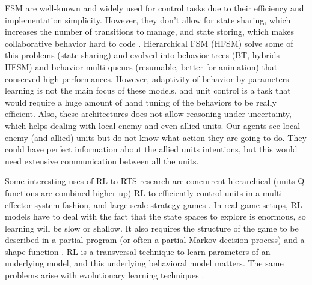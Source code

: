 FSM are well-known and widely used for control tasks due to their efficiency and implementation simplicity. However, they don't allow for state sharing, which increases the number of transitions to manage, and state storing, which makes collaborative behavior hard to code \citep{Cutumisu09}. Hierarchical FSM (HFSM) solve some of this problems (state sharing) and evolved into behavior trees (BT, hybrids HFSM) \citep{Isla} and behavior multi-queues (resumable, better for animation) \citep{Cutumisu09} that conserved high performances. %
However, adaptivity of behavior by parameters learning is not the main focus of these models, and unit control is a task that would require a huge amount of hand tuning of the behaviors to be really efficient. 
Also, these architectures does not allow reasoning under uncertainty, which helps dealing with local enemy and even allied units. Our agents see local enemy (and allied) units but do not know what action they are going to do. They could have perfect information about the allied units intentions, but this would need extensive communication between all the units.

Some interesting uses of RL \citep{Sutton} to RTS research are concurrent hierarchical (units Q-functions are combined higher up) RL \citep{Marthi05concurrenthierarchical} to efficiently control units in a multi-effector system fashion, and large-scale strategy games \citep{Madeira06}. In real game setups, RL models have to deal with the fact that the state spaces to explore is enormous, so learning will be slow or shallow. It also requires the structure of the game to be described in a partial program (or often a partial Markov decision process) and a shape function \citep{Marthi05concurrenthierarchical}. RL is a transversal technique to learn parameters of an underlying model, and this underlying behavioral model matters. The same problems arise with evolutionary learning techniques \citep{GA}.

